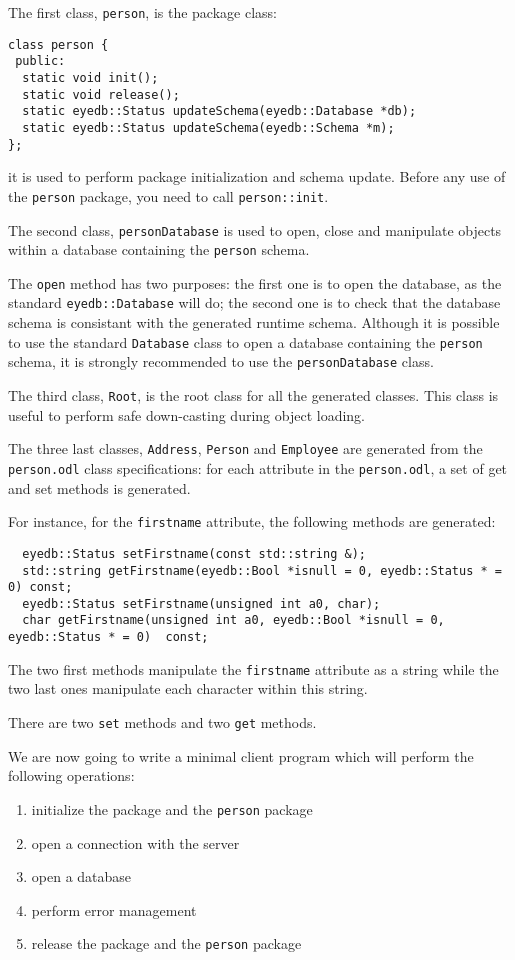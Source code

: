 The first class, \texttt{person}, is the package class:
\verbsize \begin{verbatim}
class person {
 public:
  static void init();
  static void release();
  static eyedb::Status updateSchema(eyedb::Database *db);
  static eyedb::Status updateSchema(eyedb::Schema *m);
};
\end{verbatim}
\normalsize
it is used to perform package initialization and schema update.
Before any use of the \texttt{person} package, you need to call
\texttt{person::init}. 

The second class, \texttt{personDatabase} is used to open, close and
manipulate objects within a database containing the \texttt{person} schema.

The \texttt{open} method has two
purposes: the first one is to open the database, as the standard
\texttt{eyedb::Database} will do; the second one is to check that the database
schema is consistant with the generated runtime schema.
Although it is possible to use the standard \texttt{Database} class to open
a database containing the \texttt{person} schema, it is strongly recommended
to use the \texttt{personDatabase} class.

The third class, \texttt{Root}, is the root class for all the generated classes.
This class is useful to perform safe down-casting during object loading.

The three last classes, \texttt{Address}, \texttt{Person} and \texttt{Employee}
are generated from the \texttt{person.odl} class specifications: for each
attribute in the \texttt{person.odl}, a set of get and set methods is generated.

For instance, for the \texttt{firstname} attribute, the following methods
are generated:
\verbsize \begin{verbatim}
  eyedb::Status setFirstname(const std::string &);
  std::string getFirstname(eyedb::Bool *isnull = 0, eyedb::Status * = 0) const;
  eyedb::Status setFirstname(unsigned int a0, char);
  char getFirstname(unsigned int a0, eyedb::Bool *isnull = 0, eyedb::Status * = 0)  const;
\end{verbatim}
\normalsize
The two first methods manipulate the \texttt{firstname} attribute as a string
while the two last ones manipulate each character within this string.

There are two \texttt{set} methods and two \texttt{get} methods.


We are now going to write a minimal client program which will perform
the following operations:
\begin{enumerate}
\item initialize the \eyedb package and the \texttt{person} package
\item open a connection with the \eyedb server
\item open a database
\item perform error management
\item release the \eyedb package and the \texttt{person} package
\end{enumerate}

